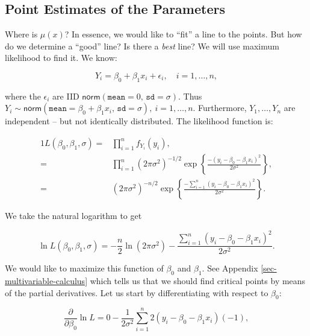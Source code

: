 \documentclass[]{book}
\numberwithin{equation}{chapter}
\numberwithin{figure}{chapter}
\theoremstyle{plain}
\theoremstyle{definition}
\theoremstyle{remark}
\theoremstyle{definition}
\theoremstyle{definition}
\theoremstyle{remark}
\begin{document}
\subsection{Point Estimates of the
Parameters}\label{sub-point-estimate-mle-slr}

Where is \(\mu(x)\)? In essence, we would like to ``fit'' a line to the
points. But how do we determine a ``good'' line? Is there a \emph{best}
line? We will use maximum likelihood  to find
it. We know:

\begin{equation}
Y_{i} = \beta_{0} + \beta_{1}x_{i} + \epsilon_{i},\quad i=1,\ldots,n,
\end{equation}

where the \(\epsilon_{i}\) are IID
\(\mathsf{norm}(\mathtt{mean}=0,\,\mathtt{sd}=\sigma)\). Thus
\(Y_{i}\sim\mathsf{norm}(\mathtt{mean}=\beta_{0}+\beta_{1}x_{i},\,\mathtt{sd}=\sigma),\
i=1,\ldots,n\). Furthermore, \(Y_{1},\ldots,Y_{n}\) are independent --
but not identically distributed. The likelihood function
 is:

\begin{alignat}{1}
L(\beta_{0},\beta_{1},\sigma)= & \prod_{i=1}^{n}f_{Y_{i}}(y_{i}),\\
= & \prod_{i=1}^{n}(2\pi\sigma^{2})^{-1/2}\exp\left\{ \frac{-(y_{i}-\beta_{0}-\beta_{1}x_{i})^{2}}{2\sigma^{2}}\right\} ,\\
= & (2\pi\sigma^{2})^{-n/2}\exp\left\{ \frac{-\sum_{i=1}^{n}(y_{i}-\beta_{0}-\beta_{1}x_{i})^{2}}{2\sigma^{2}}\right\} .
\end{alignat}

We take the natural logarithm to get

\begin{equation}
\label{eq-regML-lnL}
\ln L(\beta_{0},\beta_{1},\sigma)=-\frac{n}{2}\ln(2\pi\sigma^{2})-\frac{\sum_{i=1}^{n}(y_{i}-\beta_{0}-\beta_{1}x_{i})^{2}}{2\sigma^{2}}.
\end{equation}

We would like to maximize this function of \(\beta_{0}\) and
\(\beta_{1}\). See Appendix \ref{sec-multivariable-calculus} which tells
us that we should find critical points by means of the partial
derivatives. Let us start by differentiating with respect to
\(\beta_{0}\):

\begin{equation}
\frac{\partial}{\partial\beta_{0}}\ln L=0-\frac{1}{2\sigma^{2}}\sum_{i=1}^{n}2(y_{i}-\beta_{0}-\beta_{1}x_{i})(-1),
\end{equation}
\end{document}
